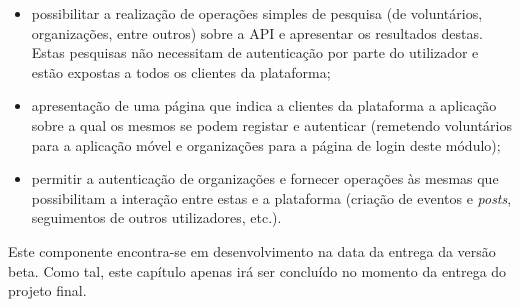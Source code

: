 \begin{itemize}
	\item possibilitar a realização de operações simples de pesquisa (de voluntários, organizações, entre outros) sobre a API e apresentar os resultados destas. Estas pesquisas não necessitam de autenticação por parte do utilizador e estão expostas a todos os clientes da plataforma;
	\item apresentação de uma página que indica a clientes da plataforma a aplicação sobre a qual os mesmos se podem registar e autenticar (remetendo voluntários para a aplicação móvel e organizações para a página de login deste módulo);
	\item permitir a autenticação de organizações e fornecer operações às mesmas que possibilitam a interação entre estas e a plataforma (criação de eventos e \textit{posts}, seguimentos de outros utilizadores, etc.).
\end{itemize}

\bigskip \bigskip

Este componente encontra-se em desenvolvimento na data da entrega da versão beta. Como tal, este capítulo apenas irá ser concluído no momento da entrega do projeto final.